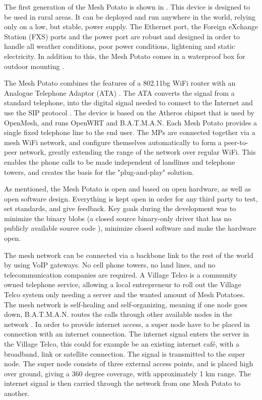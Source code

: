 The first generation of the Mesh Potato is shown in . This device is designed to be used in rural areas. It can be deployed and run anywhere in the world, relying only on a low, but stable, power supply. The Ethernet port, the Foreign eXchange Station (FXS) ports and the power port are robust and designed in order to handle all weather conditions, poor power conditions, lightening and static electricity. In addition to this, the Mesh Potato comes in a waterproof box for outdoor mounting \cite{background}.

The Mesh Potato combines the features of a 802.11bg WiFi router with an Analogue Telephone Adaptor (ATA) \cite{MP}. The ATA converts the signal from a standard telephone, into the digital signal needed to connect to the Internet and use the SIP protocol \cite{MParticle}. The device is based on the Atheros chipset that is used by OpenMesh, and runs OpenWRT and B.A.T.M.A.N. Each Mesh Potato provides a single fixed telephone line to the end user. The MPs are connected together via a mesh WiFi network, and configure themselves automatically to form a peer-to-peer network, greatly extending the range of the network over regular WiFi. This enables the phone calls to be made independent of landlines and telephone towers, and creates the basis for the "plug-and-play" solution. 

As mentioned, the Mesh Potato is open and based on open hardware, as well as open software design. Everything is kept open in order for any third party to test, set standards, and give feedback. Key goals during the development was to minimize the binary blobs (a closed source binary-only driver that has no publicly available source code \cite{binaryBolb}), minimize closed software and make the hardware open. 

The mesh network can be connected via a backbone link to the rest of the world by using VoIP gateways. No cell phone towers, no land lines, and no telecommunication companies are required. A Village Telco is a community owned telephone service, allowing a local entrepreneur to roll out the Village Telco system only needing a server and the wanted amount of Mesh Potatoes. The mesh network is self-healing and self-organizing, meaning if one node goes down, B.A.T.M.A.N. routes the calls through other available nodes in the network \cite{MPbyRowe}. In order to provide internet access, a super node have to be placed in connection with an internet connection. The internet signal enters the server in the Village Telco, this could for example be an existing internet café, with a broadband, link or satellite connection. The signal is transmitted to the super node. The super node consists of three external access points, and is placed high over ground, giving a 360 degree coverage, with approximately 1 km range. The internet signal is then carried through the network from one Mesh Potato to another. 


